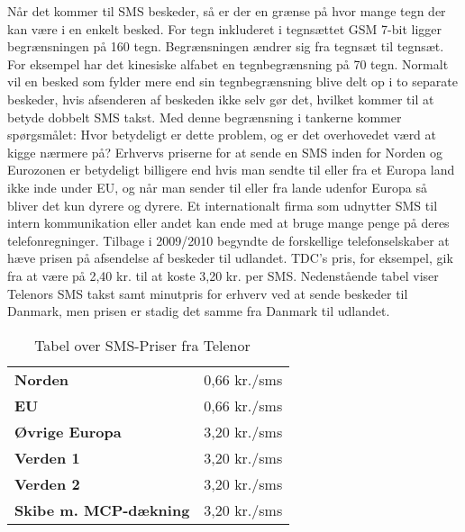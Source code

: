 Når det kommer til SMS beskeder, så er der en grænse på hvor mange tegn der kan være i en enkelt besked. For tegn inkluderet i tegnsættet GSM 7-bit ligger begrænsningen på 160 tegn. Begrænsningen ændrer sig fra tegnsæt til tegnsæt. For eksempel har det kinesiske alfabet en tegnbegrænsning på 70 tegn\cite{Pro_1}. Normalt vil en besked som fylder mere end sin tegnbegrænsning blive delt op i to separate beskeder, hvis afsenderen af beskeden ikke selv gør det, hvilket kommer til at betyde dobbelt SMS takst. Med denne begrænsning i tankerne kommer spørgsmålet: Hvor betydeligt er dette problem, og er det overhovedet værd at kigge nærmere på?
Erhvervs priserne for at sende en SMS inden for Norden og Eurozonen er betydeligt billigere end hvis man sendte til eller fra et Europa land ikke inde under EU, og når man sender til eller fra lande udenfor Europa så bliver det kun dyrere og dyrere. Et internationalt firma som udnytter SMS til intern kommunikation eller andet kan ende med at bruge mange penge på deres telefonregninger. Tilbage i 2009/2010 begyndte de forskellige telefonselskaber at hæve prisen på afsendelse af beskeder til udlandet. TDC's pris, for eksempel, gik fra at være på 2,40 kr. til at koste 3,20 kr. per SMS\cite{Pro_2}. Nedenstående tabel viser Telenors SMS takst samt minutpris for erhverv ved at sende beskeder til Danmark, men prisen er stadig det samme fra Danmark til udlandet\cite{Pro_3_1}.

\begin{table}[H]
\begin{center}
\begin{tabular}{ | l | r |}
    \hline
    \cellcolor{ForestGreen} &  \cellcolor{ForestGreen}\color{white}{\textbf{Sende/Modtage SMS}}\\[2ex] \hline
    \textbf{Norden} & 0,66 kr./sms \\ \hline
    \textbf{EU} & 0,66 kr./sms \\ \hline
    \textbf{Øvrige Europa} & 3,20 kr./sms \\ \hline
    \textbf{Verden 1} & 3,20 kr./sms \\ \hline
    \textbf{Verden 2} & 3,20 kr./sms \\ \hline
    \textbf{Skibe m. MCP-dækning} & 3,20 kr./sms \\ \hline
\end{tabular} 
\caption{Tabel over SMS-Priser fra Telenor ~\cite{Pro_3_2}}
\end{center}
\end{table}

